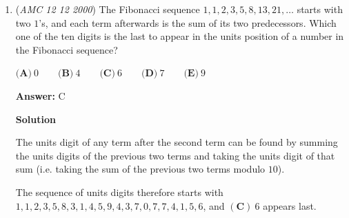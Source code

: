 \begin{enumerate}
 $\textbf{(A)}\ 40 \qquad \textbf{(B)}\ 50 \qquad \textbf{(C)}\ 55 \qquad \textbf{(D)}\ 60 \qquad \textbf{(E)}\ 75$

 \textbf{Answer: }B



\textbf{Solution 1 (Algebra)}

Let $x$ be the number of jellybeans originally in the jar. Then after one day, there were $0.8x$ jellybeans left, while after two days, there were $0.8(0.8x)=0.64x$ jellybeans left.  So $0.64x = 32$ and thus $x = \boxed{\textbf{(B)}\ 50}$.

 -armang32324, edited by j314andrews

 



\textbf{Solution 2}

At the end of the day, $80\% = \frac{4}{5}$ of the jellybeans from the start of the day remained.  So after one day, there were $32 \div \frac{4}{5} = 40$ jellybeans left, while at the start, there were $40 \div \frac{4}{5} = \boxed{\textbf{(B)}\ 50}$ jellybeans left.

 



\textbf{Solution 3 (Answer Choices)}

Starting with each answer choice (A) through (E) results in $25.6$, $32$, $35.2$, $38.4$, and $48$ jellybeans left after two days, respectively.  So $\boxed{\textbf{(B)} \ 50}$ is correct.

 


	\item (\textit{AMC 12 12 2000}) The Fibonacci sequence $1,1,2,3,5,8,13,21,\ldots$ starts with two $1$'s, and each term afterwards is the sum of its two predecessors. Which one of the ten digits is the last to appear in the units position of a number in the Fibonacci sequence?


 $\textbf{(A)}\ 0 \qquad \textbf{(B)}\ 4 \qquad \textbf{(C)}\ 6 \qquad \textbf{(D)}\ 7 \qquad \textbf{(E)}\ 9$

 \textbf{Answer: }C



\textbf{Solution}

The units digit of any term after the second term can be found by summing the units digits of the previous two terms and taking the units digit of that sum (i.e. taking the sum of the previous two terms modulo $10$).

 The sequence of units digits therefore starts with $1,1,2,3,5,8,3,1,4,5,9,4,3,7,0,7,7,4,1,5,6$, and $\boxed{\mathbf{(C)}\ 6}$ appears last.


\end{enumerate}
